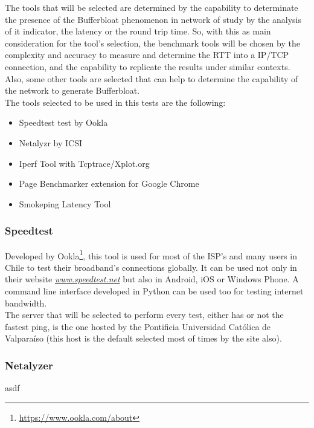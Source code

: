 The tools that will be selected are determined by the capability to
determinate the presence of the Bufferbloat phenomenon in network of study by the 
analysis of it indicator, the latency or the round trip time. So, with this as 
main consideration for the tool's selection, the benchmark tools will be
chosen by the complexity and accuracy to measure and determine the RTT into a
IP/TCP connection, and the capability to replicate the results under similar 
contexts. Also, some other tools are selected that can help to determine the 
capability of the network to generate Bufferbloat.\\

The tools selected to be used in this tests are the following:

\begin{itemize}
    \item Speedtest test by Ookla
    \item Netalyzr by ICSI
    \item Iperf Tool with Tcptrace/Xplot.org
    \item Page Benchmarker extension for Google Chrome
    \item Smokeping Latency Tool
\end{itemize}

\subsubsection{Speedtest}

Developed by Ookla\footnote{\url{https://www.ookla.com/about}}, this tool is used
for most of the ISP's and many users in Chile to test their broadband's
connections globally. It can be used not only in their website 
\href{http://www.speedtest.net}{\textit{www.speedtest.net}} but also in Android,
iOS or Windows Phone. A command line interface developed in Python can be used 
too for testing internet bandwidth.\\

The server that will be selected to perform every test, either has or not the
fastest ping, is the one hosted by the Pontificia Universidad Cat\'olica de
Valpara\'iso (this host is the default selected most of times by the site also).  

\subsubsection{Netalyzer\cite{netalyzr}}

asdf

